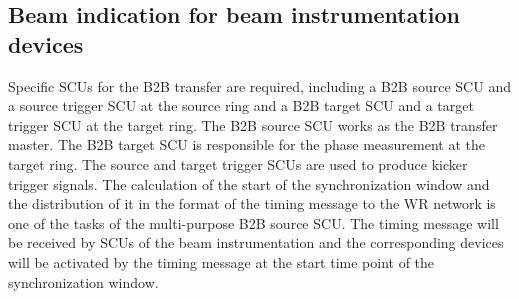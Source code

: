 \subsection{Beam indication for beam instrumentation devices}
Specific SCUs for the B2B transfer are required, including a B2B source SCU and a source trigger SCU at the source ring and a B2B target SCU and a target trigger SCU at the target ring. The B2B source SCU works as the B2B transfer master. The B2B target SCU is responsible for the phase measurement at the target ring. The source and target trigger SCUs are used to produce kicker trigger signals. The calculation of the start of the synchronization window and the distribution of it in the format of the timing message to the WR network is one of the tasks of the multi-purpose B2B source SCU. The timing message will be received by SCUs of the beam instrumentation and the corresponding devices will be activated by the timing message at the start time point of the synchronization window.